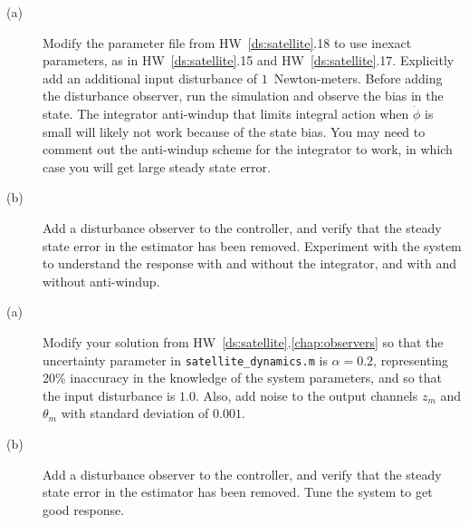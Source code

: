 
\begin{description}
\item[(a)] Modify the parameter file from HW~\ref{ds:satellite}.18 to use inexact parameters, as in HW~\ref{ds:satellite}.15 and HW~\ref{ds:satellite}.17.  Explicitly add an additional input disturbance of $1$~Newton-meters.  Before adding the disturbance observer, run the simulation and observe the bias in the state.  The integrator anti-windup that limits integral action when $\dot{\phi}$ is small will likely not work because of the state bias.  You may need to comment out the anti-windup scheme for the integrator to work, in which case you will get large steady state error.
\item[(b)] Add a disturbance observer to the controller, and verify that the steady state error in the estimator has been removed.  Experiment with the system to understand the response with and without the integrator, and with and without anti-windup.
\end{description}

\begin{description}
\item[(a)] Modify your solution from HW~\ref{ds:satellite}.\ref{chap:observers} so that the uncertainty parameter in {\tt  satellite\_dynamics.m} is $\alpha=0.2$, representing 20\% inaccuracy in the knowledge of the system parameters, and so that the input disturbance is $1.0$. Also, add noise to the output channels $z_m$ and $\theta_m$ with standard deviation of $0.001$.  
\item[(b)] Add a disturbance observer to the controller, and verify that the steady state error in the estimator has been removed.  Tune the system to get good response.
\end{description}
